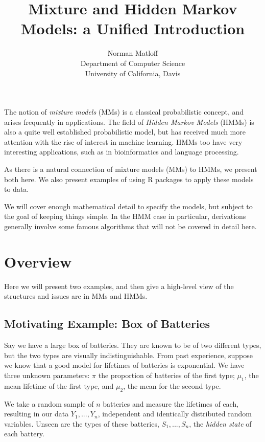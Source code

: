 \documentclass[11pt]{article}
\begin{document}
 

\title{Mixture and Hidden Markov Models: a Unified Introduction}
\author{Norman Matloff \\
   Department of Computer Science \\
   University of California, Davis}

\maketitle

The notion of \textit{mixture models} (MMs)  is a classical
probabilistic concept, and arises frequently in applications.  The field
of \textit{Hidden Markov Models} (HMMs) is also a quite well established
probabilistic model, but has received much more attention with the rise
of interest in machine learning.  HMMs too have very interesting
applications, such as in bioinformatics and language processing.

As there is a natural connection of mixture models (MMs) to HMMs, we
present both here.  We also present examples of using R packages to
apply these models to data.

We will cover enough mathematical detail to specify the models, but
subject to the goal of keeping things simple.  In the HMM case in
particular, derivations generally involve some famous algorithms that
will not be covered in detail here.

\section{Overview}

Here we will present two examples, and then give a high-level view of
the structures and issues are in MMs and HMMs.

\subsection{Motivating Example:  Box of Batteries}

Say we have a large box of batteries.  They are known to be of two
different types, but the two types are visually indistinguishable.
From past experience, suppose we know that a good model for lifetimes of
batteries is exponential.  We have three unknown parameters: $\pi$ the
proportion of batteries of the first type; $\mu_1$, the mean lifetime of
the first type, and $\mu_2$, the mean for the second type.

We take a random sample of $n$ batteries and measure the lifetimes of
each, resulting in our data $Y_1,...,Y_n$, independent and identically
distributed random variables.  Unseen are the types of these batteries,
$S_1,...,S_n$, the \textit{hidden state} of each battery.
\end{document}
